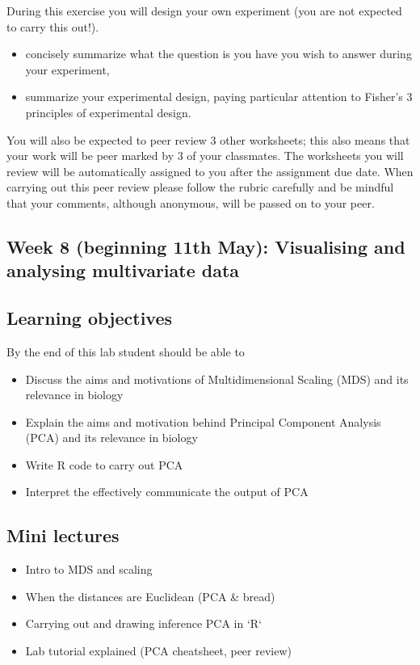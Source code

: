 \documentclass{article}
\begin{document}
During this exercise you will design your own experiment (you are not expected to carry this out!). 

\begin{itemize}
\item concisely summarize what the question is you have you wish to answer during your experiment,

\item summarize your experimental design, paying particular attention to Fisher's 3 principles of experimental design.
\end{itemize}

You will also be expected to peer review 3 other worksheets; this also means that your work will be peer marked by 3 of your classmates. The worksheets you will review will be automatically assigned to you after the assignment due date. When carrying out this peer review please follow the rubric carefully and be mindful that your comments, although anonymous, will be passed on to your peer.


\newpage

\subsection*{Week 8 (beginning 11th May): Visualising and analysing multivariate data}
\subsection*{Learning objectives}
By the end of this lab student should be able to
\begin{itemize}
\item Discuss the aims and motivations of Multidimensional Scaling (MDS) and its relevance in biology
   \item Explain the aims and motivation behind Principal Component Analysis (PCA) and its relevance in biology
   \item Write R code to carry out PCA
   \item Interpret the effectively communicate the output of PCA
\end{itemize}

\subsection*{Mini lectures}

\begin{itemize}
\item Intro to MDS and scaling
\item When the distances are Euclidean (PCA \& bread)
\item Carrying out and drawing inference PCA in `R`
\item Lab tutorial explained (PCA cheatsheet, peer review)
\end{itemize}
\end{document}

